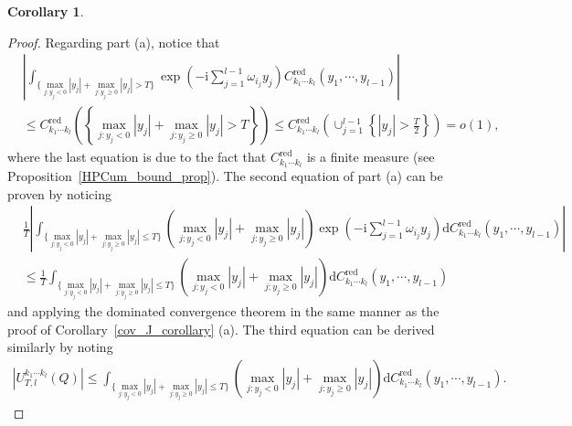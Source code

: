 \documentclass[11pt]{article}
\numberwithin{equation}{section}
\theoremstyle{plain}
\theoremstyle{definition}
\theoremstyle{definition}
\theoremstyle{assumption}
\theoremstyle{proposition}
\theoremstyle{proposition}
\newtheorem{corollary}{Corollary}[section]
\theoremstyle{example}
\theoremstyle{lemma}
\theoremstyle{theorem}
\theoremstyle{remark}
\begin{document}
\begin{corollary}
\begin{proof}
Regarding part (a), notice that 
\begin{align*}
&\left|\int_{\{\max_{j:y_j<0}|y_j| + \max_{j:y_j\geqslant0}|y_j|> T\}}\exp\left(-\mathrm{i}\sum_{j=1}^{l-1}\omega_{i_j} y_j\right) C_{k_1\cdots k_l}^{\mathrm{red}}(y_1,\cdots,y_{l-1}) \right| \\
&\leqslant C_{k_1\cdots k_l}^{\mathrm{red}}\left(\left\{\max_{j:y_j<0}|y_j| + \max_{j:y_j\geqslant0}|y_j|> T\right\}\right) 
\leqslant C_{k_1\cdots k_l}^{\mathrm{red}}\left(\cup_{j=1}^{l-1}\left\{|y_j|>\frac{T}{2}\right\}\right)
=o(1),
\end{align*}
where the last equation is due to the fact that $C_{k_1\cdots k_l}^{\mathrm{red}}$ is a finite measure (see Proposition~\ref{HPCum_bound_prop}). The second equation of part (a) can be proven by noticing 
\begin{align*}
&\frac{1}{T}\left|\int_{\{\max_{j:y_j<0}|y_j| + \max_{j:y_j\geqslant0}|y_j|\leqslant T\}}\left(\max_{j:y_j<0}|y_j| + \max_{j:y_j\geqslant0}|y_j|\right)\exp\left(-\mathrm{i}\sum_{j=1}^{l-1}\omega_{i_j} y_j\right) \mathrm{d}C_{k_1\cdots k_l}^{\mathrm{red}}(y_1, \cdots, y_{l-1})\right| \\
&\leqslant \frac{1}{T}\int_{\{\max_{j:y_j<0}|y_j| + \max_{j:y_j\geqslant0}|y_j|\leqslant T\}}\left(\max_{j:y_j<0}|y_j| + \max_{j:y_j\geqslant0}|y_j|\right)\mathrm{d}C_{k_1\cdots k_l}^{\mathrm{red}}(y_1, \cdots, y_{l-1})    
\end{align*}
and applying the dominated convergence theorem in the same manner as the proof of Corollary~\ref{cov_J_corollary} (a). The third equation can be derived similarly by noting
\begin{align*}
|U_{T,l}^{k_1\cdots k_l}\left(Q\right)|
\leqslant\int_{\{\max_{j:y_j<0}|y_j| + \max_{j:y_j\geqslant0}|y_j|\leqslant T\}}\left(\max_{j:y_j<0}|y_j| + \max_{j:y_j\geqslant0}|y_j|\right) \mathrm{d}C_{k_1\cdots k_l}^{\mathrm{red}}(y_1, \cdots, y_{l-1}).
\end{align*}


\end{proof}
\end{corollary}
\end{document}
